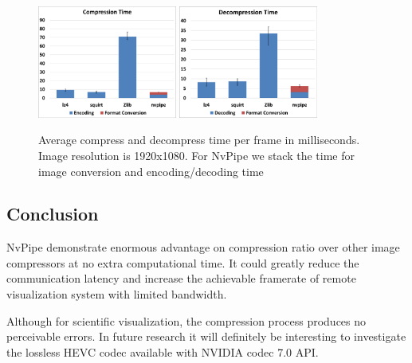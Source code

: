 \documentclass{vgtc}                          %
\begin{document}
\begin{figure}[htb]
  \label{figure:time}
  \centering
  \includegraphics[width=1.8in]{encodingTime.eps}
  \includegraphics[width=1.8in]{decodingTime.eps}
  \caption{Average compress and decompress time per frame in milliseconds. Image resolution is 1920x1080. For NvPipe we stack the time for image conversion and encoding/decoding time}
\end{figure}

\subsection{Conclusion}

NvPipe demonstrate enormous advantage on compression ratio over other image compressors at no extra computational time. It could greatly reduce the communication latency and increase the achievable framerate of remote visualization system with limited bandwidth.

Although for scientific visualization, the compression process produces no perceivable errors. In future research it will definitely be interesting to investigate the lossless HEVC codec available with NVIDIA codec 7.0 API.



\nocite{*}

\end{document}
